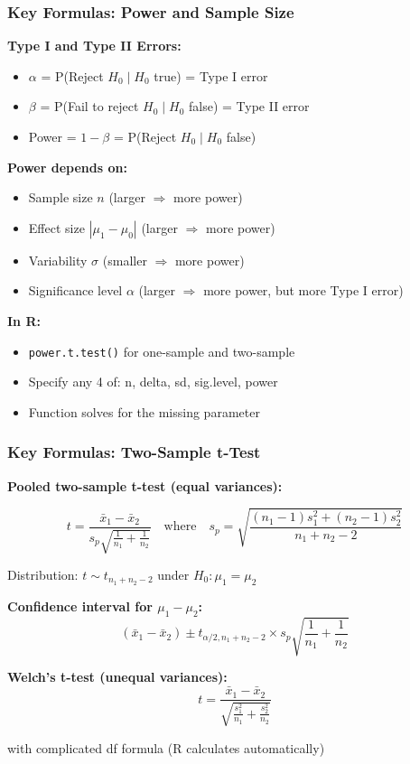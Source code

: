 \documentclass{beamer}
\begin{document}
\begin{frame}
\frametitle{Key Formulas: Power and Sample Size}
\textbf{Type I and Type II Errors:}
\begin{itemize}
\item $\alpha$ = P(Reject $H_0 \mid H_0$ true) = Type I error
\item $\beta$ = P(Fail to reject $H_0 \mid H_0$ false) = Type II error
\item Power = $1 - \beta$ = P(Reject $H_0 \mid H_0$ false)
\end{itemize}

\vspace{0.3cm}
\textbf{Power depends on:}
\begin{itemize}
\item Sample size $n$ (larger $\Rightarrow$ more power)
\item Effect size $|\mu_1 - \mu_0|$ (larger $\Rightarrow$ more power)
\item Variability $\sigma$ (smaller $\Rightarrow$ more power)
\item Significance level $\alpha$ (larger $\Rightarrow$ more power, but more Type I error)
\end{itemize}

\vspace{0.3cm}
\textbf{In R:}
\begin{itemize}
\item \texttt{power.t.test()} for one-sample and two-sample
\item Specify any 4 of: n, delta, sd, sig.level, power
\item Function solves for the missing parameter
\end{itemize}
\end{frame}

\begin{frame}
\frametitle{Key Formulas: Two-Sample t-Test}
\textbf{Pooled two-sample t-test (equal variances):}

$$t = \frac{\bar{x}_1 - \bar{x}_2}{s_p \sqrt{\frac{1}{n_1} + \frac{1}{n_2}}} \quad \text{where} \quad s_p = \sqrt{\frac{(n_1-1)s_1^2 + (n_2-1)s_2^2}{n_1+n_2-2}}$$

Distribution: $t \sim t_{n_1+n_2-2}$ under $H_0: \mu_1 = \mu_2$

\vspace{0.3cm}
\textbf{Confidence interval for $\mu_1 - \mu_2$:}
$$(\bar{x}_1 - \bar{x}_2) \pm t_{\alpha/2, n_1+n_2-2} \times s_p\sqrt{\frac{1}{n_1} + \frac{1}{n_2}}$$

\vspace{0.3cm}
\textbf{Welch's t-test (unequal variances):}
$$t = \frac{\bar{x}_1 - \bar{x}_2}{\sqrt{\frac{s_1^2}{n_1} + \frac{s_2^2}{n_2}}}$$

with complicated df formula (R calculates automatically)
\end{frame}
\end{document}
